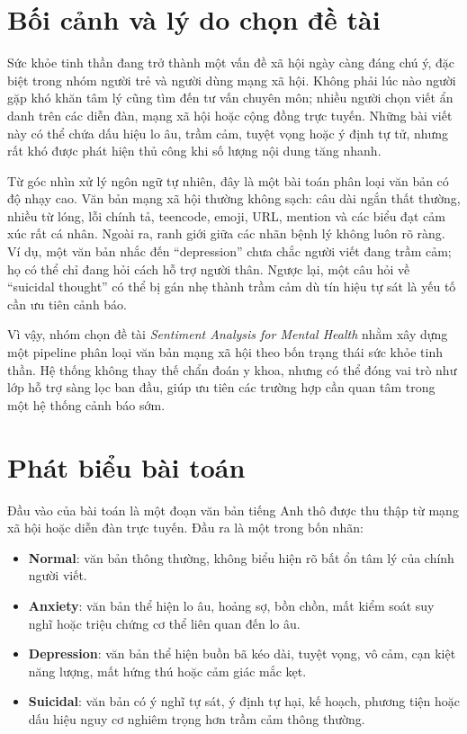 \documentclass[12pt,a4paper,oneside]{report}
\newlength{\manualparindent}
\newcommand{\manualindent}{\hspace*{\manualparindent}}
\begin{document}
\section{Bối cảnh và lý do chọn đề tài}

\manualindent%
Sức khỏe tinh thần đang trở thành một vấn đề xã hội ngày càng đáng chú ý, đặc biệt trong nhóm người trẻ và người dùng mạng xã hội. Không phải lúc nào người gặp khó khăn tâm lý cũng tìm đến tư vấn chuyên môn; nhiều người chọn viết ẩn danh trên các diễn đàn, mạng xã hội hoặc cộng đồng trực tuyến. Những bài viết này có thể chứa dấu hiệu lo âu, trầm cảm, tuyệt vọng hoặc ý định tự tử, nhưng rất khó được phát hiện thủ công khi số lượng nội dung tăng nhanh.

\manualindent%
Từ góc nhìn xử lý ngôn ngữ tự nhiên, đây là một bài toán phân loại văn bản có độ nhạy cao. Văn bản mạng xã hội thường không sạch: câu dài ngắn thất thường, nhiều từ lóng, lỗi chính tả, teencode, emoji, URL, mention và các biểu đạt cảm xúc rất cá nhân. Ngoài ra, ranh giới giữa các nhãn bệnh lý không luôn rõ ràng. Ví dụ, một văn bản nhắc đến ``depression'' chưa chắc người viết đang trầm cảm; họ có thể chỉ đang hỏi cách hỗ trợ người thân. Ngược lại, một câu hỏi về ``suicidal thought'' có thể bị gán nhẹ thành trầm cảm dù tín hiệu tự sát là yếu tố cần ưu tiên cảnh báo.

\manualindent%
Vì vậy, nhóm chọn đề tài \textit{Sentiment Analysis for Mental Health} nhằm xây dựng một pipeline phân loại văn bản mạng xã hội theo bốn trạng thái sức khỏe tinh thần. Hệ thống không thay thế chẩn đoán y khoa, nhưng có thể đóng vai trò như lớp hỗ trợ sàng lọc ban đầu, giúp ưu tiên các trường hợp cần quan tâm trong một hệ thống cảnh báo sớm.

\section{Phát biểu bài toán}

\manualindent%
Đầu vào của bài toán là một đoạn văn bản tiếng Anh thô được thu thập từ mạng xã hội hoặc diễn đàn trực tuyến. Đầu ra là một trong bốn nhãn:

\begin{itemize}
  \item \textbf{Normal}: văn bản thông thường, không biểu hiện rõ bất ổn tâm lý của chính người viết.
  \item \textbf{Anxiety}: văn bản thể hiện lo âu, hoảng sợ, bồn chồn, mất kiểm soát suy nghĩ hoặc triệu chứng cơ thể liên quan đến lo âu.
  \item \textbf{Depression}: văn bản thể hiện buồn bã kéo dài, tuyệt vọng, vô cảm, cạn kiệt năng lượng, mất hứng thú hoặc cảm giác mắc kẹt.
  \item \textbf{Suicidal}: văn bản có ý nghĩ tự sát, ý định tự hại, kế hoạch, phương tiện hoặc dấu hiệu nguy cơ nghiêm trọng hơn trầm cảm thông thường.
\end{itemize}
\end{document}
